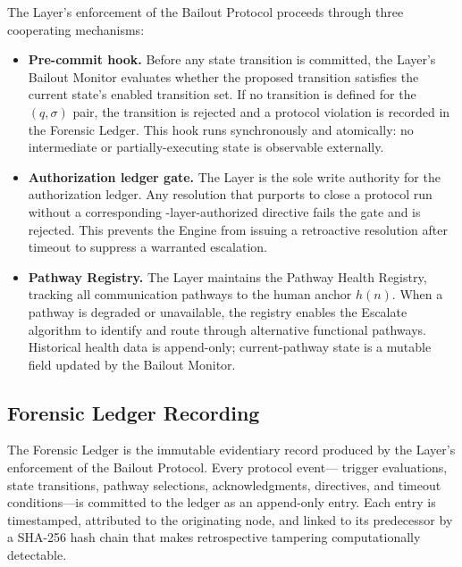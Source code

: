 The \fact{} Layer's enforcement of the Bailout Protocol proceeds through three
cooperating mechanisms:

\begin{itemize}\itemsep=0pt
\item[(\textit{i})] \textbf{Pre-commit hook.}  Before any state transition is
committed, the \fact{} Layer's Bailout Monitor evaluates whether the proposed
transition satisfies the current state's enabled transition set.  If no
transition is defined for the $(q,\sigma)$ pair, the transition is rejected and a
protocol violation is recorded in the Forensic Ledger.  This hook runs
synchronously and atomically: no intermediate or partially-executing state is
observable externally.

\item[(\textit{ii})] \textbf{Authorization ledger gate.}  The \fact{} Layer is
the sole write authority for the authorization ledger.  Any resolution that
purports to close a protocol run without a corresponding \purpose-layer-authorized
directive fails the gate and is rejected.  This prevents the \bounds{} Engine
from issuing a retroactive resolution after timeout to suppress a warranted
escalation.

\item[(\textit{iii})] \textbf{Pathway Registry.}  The \fact{} Layer maintains the
Pathway Health Registry, tracking all communication pathways to the human anchor
$h(n)$.  When a pathway is degraded or unavailable, the registry enables the
Escalate algorithm to identify and route through alternative functional
pathways.  Historical health data is append-only; current-pathway state is a
mutable field updated by the Bailout Monitor.
\end{itemize}

\subsection{Forensic Ledger Recording}\label{sec:forensic-ledger}

The Forensic Ledger is the immutable evidentiary record produced by the
\fact{} Layer's enforcement of the Bailout Protocol.  Every protocol event---
trigger evaluations, state transitions, pathway selections, acknowledgments,
directives, and timeout conditions---is committed to the ledger as an
append-only entry.  Each entry is timestamped, attributed to the originating
node, and linked to its predecessor by a SHA-256 hash chain that makes
retrospective tampering computationally detectable.

